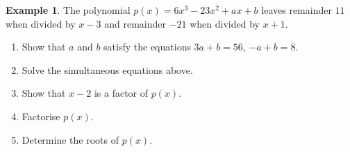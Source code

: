 \documentclass[
  12pt,
  oneside]{book}
\providecommand{\tightlist}{%
  \setlength{\itemsep}{0pt}\setlength{\parskip}{0pt}}
\theoremstyle{definition}
\theoremstyle{definition}
\newtheorem{example}{Example}[chapter]
\theoremstyle{definition}
\theoremstyle{definition}
\theoremstyle{remark}
\begin{document}
\begin{example}

The polynomial \(p(x)=6x^3-23x^2+ax+b\) leaves remainder \(11\) when divided by \(x-3\) and remainder \(-21\) when divided by \(x+1\).

\begin{enumerate}
\def\labelenumi{(\roman{enumi})}
\tightlist
\item
  Show that \(a\) and \(b\) satisfy the equations \(3a+b=56\), \(-a+b=8\).
\item
  Solve the simultaneous equations above.
\item
  Show that \(x-2\) is a factor of \(p(x)\).
\item
  Factorise \(p(x)\).
\item
  Determine the roots of \(p(x)\).
\end{enumerate}

\end{example}
\end{document}
